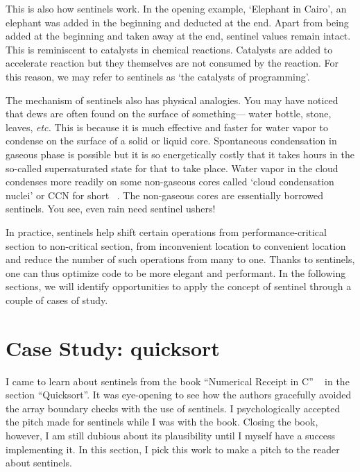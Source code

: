 \documentclass[oneside,11pt]{book}
\theoremstyle{definition}
\theoremstyle{remark}
\begin{document}
This is also how sentinels work.
In the opening example, `Elephant in Cairo', an elephant was added in the beginning and
deducted at the end.
Apart from being added at the beginning and taken away at the end, sentinel values remain intact.
This is reminiscent to catalysts in chemical reactions.
Catalysts are added to accelerate reaction but they themselves are not consumed by the reaction.
For this reason, we may refer to sentinels as `the catalysts of programming'.



The mechanism of sentinels also has physical analogies.
You may have noticed that dews are often found on the surface of something---
water bottle, stone, leaves, \textit{etc.}
This is because it is much effective and faster for water vapor to condense on
the surface of a solid or liquid core.
Spontaneous condensation in gaseous phase is possible but it is so energetically costly that it
takes hours in the so-called supersaturated state for that to take place.
Water vapor in the cloud condenses more readily on some non-gaseous cores called `cloud
condensation nuclei' or CCN for short ~\cite{condensation:2005}.
The non-gaseous cores are essentially borrowed sentinels.
You see, even rain need sentinel ushers!


In practice, sentinels help shift certain operations from performance-critical
section to non-critical section, from inconvenient location to convenient
location and reduce the number of such operations from many to one.
Thanks to sentinels, one can thus optimize code to be more elegant and performant.
In the following sections, we will identify opportunities to apply the concept of sentinel through
a couple of cases of study.



\section{Case Study: quicksort}\label{sec:quick-sort-sentinel}


I came to learn about sentinels from the book ``Numerical Receipt in C''
~\cite{NumericalRecipes:1992} in the section ``Quicksort''.
It was eye-opening to see how the authors gracefully avoided the array boundary checks
with the use of sentinels.
I psychologically accepted the pitch made for sentinels while I was with the book.
Closing the book, however, I am still dubious about its plausibility until I myself have a
success implementing it.
In this section, I pick this work to make a pitch to the reader about sentinels.
\end{document}
